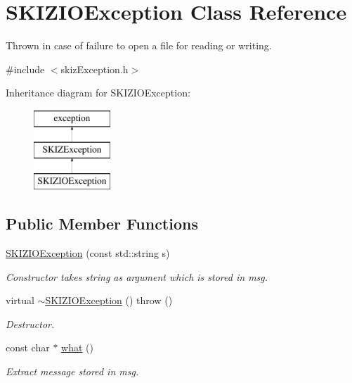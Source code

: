 \hypertarget{classSKIZIOException}{}\section{S\+K\+I\+Z\+I\+O\+Exception Class Reference}
\label{classSKIZIOException}


Thrown in case of failure to open a file for reading or writing.  




{\ttfamily \#include $<$skiz\+Exception.\+h$>$}

Inheritance diagram for S\+K\+I\+Z\+I\+O\+Exception\+:\begin{figure}[H]
\begin{center}
\leavevmode
\includegraphics[height=3.000000cm]{classSKIZIOException}
\end{center}
\end{figure}
\subsection*{Public Member Functions}
\begin{DoxyCompactItemize}
\item 
\mbox{\hyperlink{classSKIZIOException_a9f25dbc11996a8755965923611cce128}{S\+K\+I\+Z\+I\+O\+Exception}} (const std\+::string s)
\begin{DoxyCompactList}\small\item\em Constructor takes string as argument which is stored in msg. \end{DoxyCompactList}\item 
virtual \mbox{\hyperlink{classSKIZIOException_af331baab993a6666a5f6509a332510b3}{$\sim$\+S\+K\+I\+Z\+I\+O\+Exception}} ()  throw ()
\begin{DoxyCompactList}\small\item\em Destructor. \end{DoxyCompactList}\item 
const char $\ast$ \mbox{\hyperlink{classSKIZIOException_a9c1c40e5e47cb51fb0fb3803cdae4a76}{what}} ()
\begin{DoxyCompactList}\small\item\em Extract message stored in msg. \end{DoxyCompactList}\end{DoxyCompactItemize}


